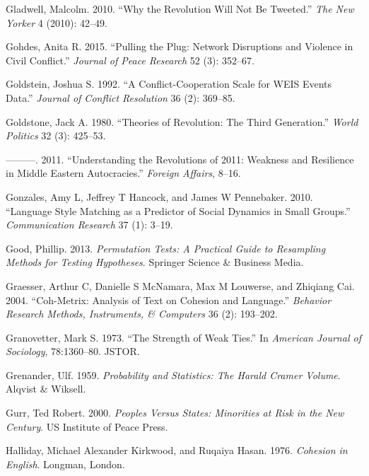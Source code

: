 \documentclass[
  english,
  man]{apa6}
\begin{document}
\leavevmode\hypertarget{ref-gladwell2010revolution}{}%
Gladwell, Malcolm. 2010. ``Why the Revolution Will Not Be Tweeted.'' \emph{The New Yorker} 4 (2010): 42--49.

\leavevmode\hypertarget{ref-gohdes2015pulling}{}%
Gohdes, Anita R. 2015. ``Pulling the Plug: Network Disruptions and Violence in Civil Conflict.'' \emph{Journal of Peace Research} 52 (3): 352--67.

\leavevmode\hypertarget{ref-goldstein1992conflict}{}%
Goldstein, Joshua S. 1992. ``A Conflict-Cooperation Scale for WEIS Events Data.'' \emph{Journal of Conflict Resolution} 36 (2): 369--85.

\leavevmode\hypertarget{ref-goldstone1980theories}{}%
Goldstone, Jack A. 1980. ``Theories of Revolution: The Third Generation.'' \emph{World Politics} 32 (3): 425--53.

\leavevmode\hypertarget{ref-goldstone2011understanding}{}%
---------. 2011. ``Understanding the Revolutions of 2011: Weakness and Resilience in Middle Eastern Autocracies.'' \emph{Foreign Affairs}, 8--16.

\leavevmode\hypertarget{ref-gonzales2010language}{}%
Gonzales, Amy L, Jeffrey T Hancock, and James W Pennebaker. 2010. ``Language Style Matching as a Predictor of Social Dynamics in Small Groups.'' \emph{Communication Research} 37 (1): 3--19.

\leavevmode\hypertarget{ref-good2013permutation}{}%
Good, Phillip. 2013. \emph{Permutation Tests: A Practical Guide to Resampling Methods for Testing Hypotheses}. Springer Science \& Business Media.

\leavevmode\hypertarget{ref-graesser2004coh}{}%
Graesser, Arthur C, Danielle S McNamara, Max M Louwerse, and Zhiqiang Cai. 2004. ``Coh-Metrix: Analysis of Text on Cohesion and Language.'' \emph{Behavior Research Methods, Instruments, \& Computers} 36 (2): 193--202.

\leavevmode\hypertarget{ref-granovetter1977strength}{}%
Granovetter, Mark S. 1973. ``The Strength of Weak Ties.'' In \emph{American Journal of Sociology}, 78:1360--80. JSTOR.

\leavevmode\hypertarget{ref-grenander1959probability}{}%
Grenander, Ulf. 1959. \emph{Probability and Statistics: The Harald Cramer Volume}. Alqvist \& Wiksell.

\leavevmode\hypertarget{ref-gurr2000peoples}{}%
Gurr, Ted Robert. 2000. \emph{Peoples Versus States: Minorities at Risk in the New Century}. US Institute of Peace Press.

\leavevmode\hypertarget{ref-halliday1976cohesion}{}%
Halliday, Michael Alexander Kirkwood, and Ruqaiya Hasan. 1976. \emph{Cohesion in English}. Longman, London.
\end{document}
